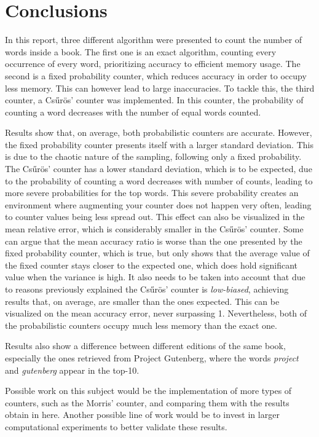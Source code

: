 \section{Conclusions}\label{section:conclusions}
In this report, three different algorithm were presented to count the number of words inside a book.
The first one is an exact algorithm, counting every occurrence of every word, prioritizing accuracy to efficient memory usage.
The second is a fixed probability counter, which reduces accuracy in order to occupy less memory.
This can however lead to large inaccuracies.
To tackle this, the third counter, a Csűrös' counter was implemented.
In this counter, the probability of counting a word decreases with the number of equal words counted. 

Results show that, on average, both probabilistic counters are accurate.
However, the fixed probability counter presents itself with a larger standard deviation.
This is due to the chaotic nature of the sampling, following only a fixed probability.
The Csűrös' counter has a lower standard deviation, which is to be expected, due to the probability of counting a word decreases with number of counts, leading to more severe probabilities for the top words.
This severe probability creates an environment where augmenting your counter does not happen very often, leading to counter values being less spread out.
This effect can also be visualized in the mean relative error, which is considerably smaller in the Csűrös' counter. 
Some can argue that the mean accuracy ratio is worse than the one presented by the fixed probability counter, which is true, but only shows that the average value of the fixed counter stays closer to the expected one, which does hold significant value when the variance is high.
It also needs to be taken into account that due to reasons previously explained the Csűrös' counter is \emph{low-biased}, achieving results that, on average, are smaller than the ones expected.
This can be visualized on the mean accuracy error, never surpassing 1.
Nevertheless, both of the probabilistic counters occupy much less memory than the exact one.

Results also show a difference between different editions of the same book, especially the ones retrieved from Project Gutenberg, where the words \emph{project} and \emph{gutenberg} appear in the top-10.

Possible work on this subject would be the implementation of more types of counters, such as the Morris' counter, and comparing them with the results obtain in here.
Another possible line of work would be to invest in larger computational experiments to better validate these results.